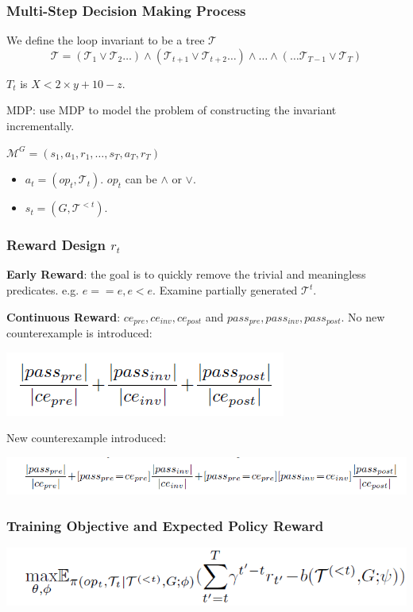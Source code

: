 \documentclass[11pt]{beamer}
\begin{document}
\begin{frame}\frametitle{Multi-Step Decision Making Process}
\begin{definition}
We define the loop invariant to be a tree $\mathcal{T}$
\[\mathcal{T} = (\mathcal{T}_1 \vee \mathcal{T}_2\ldots) \wedge (\mathcal{T}_{t+1} \vee \mathcal{T}_{t+2}\ldots)\wedge \ldots \wedge (\ldots\mathcal{T}_{T - 1} \vee \mathcal{T}_{T})\]
\end{definition}

$T_t$ is $X < 2\times y + 10 - z$.

MDP: use MDP to model the problem of constructing the invariant incrementally.

$\mathcal{M}^G = (s_1, a_1, r_1, \ldots, s_T, a_T, r_T)$
\begin{itemize}
\item $a_t = (op_t, \mathcal{T}_t)$. $op_t$ can be $\wedge $ or $\vee $.
\item $s_t = (G, \mathcal{T}^{ < t})$.

\end{itemize}

\end{frame}

\begin{frame}\frametitle{Reward Design $r_t$}
\textbf{Early Reward}: the goal is to quickly remove the trivial and meaningless predicates. e.g. $e == e, e < e$. Examine partially generated $\mathcal{T}^t$.

\textbf{Continuous Reward}: $ce_{pre}, ce_{inv}, ce_{post}$ and $pass_{pre}, pass_{inv}, pass_{post}$.
No new counterexample is introduced: 
\begin{center}
\includegraphics[scale = 0.4]{7.png}
\end{center}
New counterexample introduced: 
\begin{center}
\includegraphics[scale=0.4]{8.png}

\end{center}
\end{frame}

\begin{frame}\frametitle{Training Objective and Expected Policy Reward}

\begin{center}
\includegraphics[scale=0.4]{9.png}

\end{center}
\end{frame}
\end{document}
